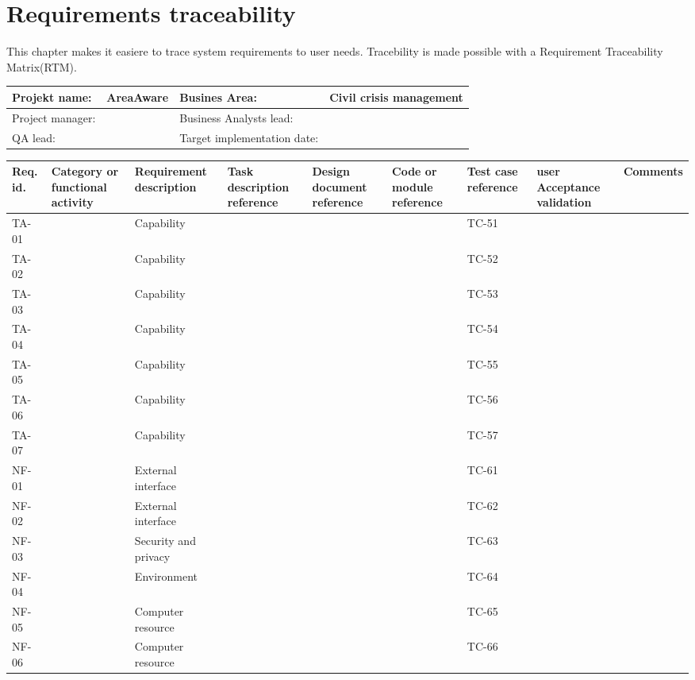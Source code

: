 \label{chp_requirementsTraceability}
\chapter{Requirements traceability}
This chapter makes it easiere to trace system requirements to user needs. Tracebility is made possible with a Requirement Traceability Matrix(RTM).

\begin{sidewaystable}
	\begin{longtable}{| p{3.5cm}  | p{5cm} |  p{3.5cm}  | p{7.8cm} |  }
		\hline
		Projekt name: 	& AreaAware & Busines Area:	& Civil crisis management \\ \hline
		Project manager:& & Business Analysts lead: 	& \\ \hline
		QA lead: 		& & Target implementation date:	& \\ \hline
	\end{longtable}
	\vspace{-9pt}
	\begin{longtable}{| p{1.1cm}  | p{2cm}  | p{5cm} |  p{1.5cm}  | p{1.5cm}  |  p{1.5cm}  | p{1.5cm}  |  p{1.5cm}  | p{2cm}  |  } \hline
		Req. id. 	& Category or functional activity & Requirement description & Task description reference & Design document reference & Code or module reference & Test case reference & user Acceptance validation & Comments \\ \hline
		TA-01&& Capability&&&& TC-51 && \\ \hline
		TA-02&& Capability&&&& TC-52 && \\ \hline
		TA-03&& Capability&&&& TC-53 && \\ \hline
		TA-04&& Capability&&&& TC-54 && \\ \hline
		TA-05&& Capability&&&& TC-55 && \\ \hline
		TA-06&& Capability&&&& TC-56 && \\ \hline
		TA-07&& Capability&&&& TC-57 && \\ \hline
		NF-01&& External interface&&&& TC-61 && \\ \hline
		NF-02&& External interface&&&& TC-62 && \\ \hline
		NF-03&& Security and privacy&&&& TC-63 && \\ \hline
		NF-04&& Environment&&&& TC-64 && \\ \hline
		NF-05&& Computer resource&&&& TC-65 && \\ \hline
		NF-06&& Computer resource&&&& TC-66 && \\ \hline

\end{longtable}
\end{sidewaystable}

